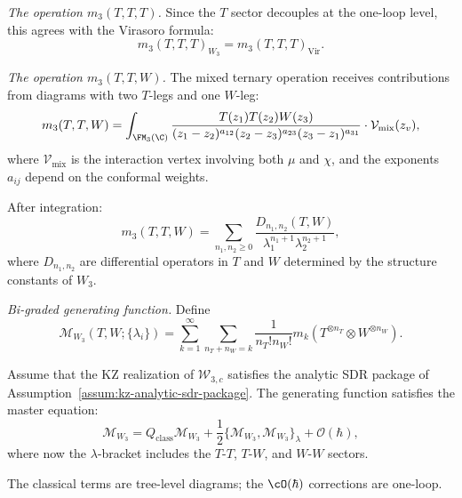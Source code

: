 \medskip
\noindent\emph{The operation $m_3(T,T,T)$.}
Since the $T$ sector decouples at the one-loop level, this agrees with the Virasoro formula:
\begin{equation}
m_3(T,T,T)_{W_3} = m_3(T,T,T)_{\text{Vir}}.
\end{equation}

\medskip
\noindent\emph{The operation $m_3(T,T,W)$.}
The mixed ternary operation receives contributions from diagrams with two $T$-legs and one $W$-leg:
\begin{equation}
\label{eq:w3-m3-TTW}
m_3(T,T,W) = \int_{\FM_3(\C)} \frac{T(z_1) T(z_2) W(z_3)}{(z_1-z_2)^{a_{12}} (z_2-z_3)^{a_{23}} (z_3-z_1)^{a_{31}}} \cdot \mathcal{V}_{\text{mix}}(z_v),
\end{equation}
where $\mathcal{V}_{\text{mix}}$ is the interaction vertex involving both $\mu$ and $\chi$, and the exponents $a_{ij}$ depend on the conformal weights.

After integration:
\begin{equation}
m_3(T,T,W) = \sum_{n_1, n_2 \geq 0} \frac{D_{n_1,n_2}(T,W)}{\lambda_1^{n_1+1} \lambda_2^{n_2+1}},
\end{equation}
where $D_{n_1,n_2}$ are differential operators in $T$ and $W$ determined by the structure constants of $W_3$.

\medskip
\noindent\emph{Bi-graded generating function.}
Define
\begin{equation}
\mathcal{M}_{W_3}(T,W; \{\lambda_i\}) = \sum_{k=1}^\infty \sum_{n_T + n_W = k} \frac{1}{n_T! n_W!} m_k(T^{\otimes n_T} \otimes W^{\otimes n_W}).
\end{equation}

\begin{theorem}
\label{thm:w3-recursive}
Assume that the KZ realization of $\mathcal W_{3,c}$ satisfies the
analytic SDR package of Assumption~\ref{assum:kz-analytic-sdr-package}.
The generating function satisfies the master equation:
\begin{equation}
\label{eq:w3-master}
\mathcal{M}_{W_3} = Q_{\text{class}} \mathcal{M}_{W_3} + \frac{1}{2} \{\mathcal{M}_{W_3}, \mathcal{M}_{W_3}\}_{\lambda} + \mathcal{O}(\hbar),
\end{equation}
where now the $\lambda$-bracket includes the $T$-$T$, $T$-$W$, and $W$-$W$ sectors.
\end{theorem}

The classical terms are tree-level diagrams;
the $\cO(\hbar)$ corrections are one-loop.

